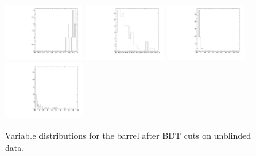 \begin{figure}
  \includegraphics[width=0.3\textwidth]{Figures/AfterBDTCut_iso_BarrelUnblinded.pdf}
  \includegraphics[width=0.3\textwidth]{Figures/AfterBDTCut_docatrk_BarrelUnblinded.pdf}
  \includegraphics[width=0.3\textwidth]{Figures/AfterBDTCut_closetrk_BarrelUnblinded.pdf}
  \includegraphics[width=0.3\textwidth]{Figures/AfterBDTCut_chi2dof_BarrelUnblinded.pdf}
  \caption{Variable distributions for the barrel after BDT cuts on unblinded data.}
  \label{fig:massPlotUnblinded}
\end{figure}

